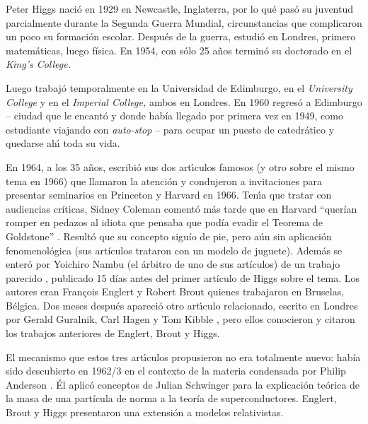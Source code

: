Peter Higgs naci\'o en 1929 en Newcastle, Inglaterra, por lo qu\'e
pas\'{o} su juventud parcialmente durante la Segunda Guerra Mundial,
circunstancias que complicaron un poco su formaci\'on escolar.
Despu\'es de la guerra, estudi\'o en Londres, primero matem\'aticas,
luego f\'isica. En 1954, con s\'olo 25 a\~nos termin\'o su
doctorado en el {\it King's College.}

Luego trabaj\'{o} temporalmente en la Universidad de Edimburgo,
en el {\it University College} y en el {\it Imperial College,} ambos
en Londres.
En 1960 regres\'{o} a Edimburgo -- ciudad que le encant\'o y donde
hab\'ia llegado por primera vez en 1949, como estudiante viajando
con {\it auto-stop} -- para ocupar un puesto de catedr\'{a}tico y
quedarse ah\'{\i} toda su vida.

	


En 1964, a los 35 a\~{n}os, escribi\'o sus dos art\'{\i}culos famosos
(y otro sobre el mismo tema en 1966) \cite{Higgs} que llamaron la
atenci\'{o}n y condujeron a invitaciones para presentar seminarios en
Princeton y Harvard en 1966. Ten\'{\i}a que tratar con audiencias cr\'iticas,
Sidney Coleman coment\'{o} m\'{a}s tarde que en Harvard ``quer\'ian
romper en pedazos al idiota que pensaba que pod\'ia evadir el
Teorema de Goldstone'' \cite{boson}. Result\'{o} que su concepto sigu\'io
de pie, pero a\'un sin aplicaci\'{o}n fenomenol\'{o}gica
(sus art\'iculos trataron con un modelo de juguete). Adem\'{a}s
se enter\'{o} por Yoichiro Nambu (el \'arbitro de uno de sus
art\'iculos) de un trabajo parecido \cite{EB}, publicado
15 d\'ias antes del primer art\'iculo de Higgs sobre el tema.
Los autores eran Fran\c{c}ois Englert y Robert Brout quienes
trabajaron en Bruselas, B\'elgica. Dos meses despu\'{e}s apareci\'{o}
otro art\'{\i}culo relacionado, escrito en Londres por
Gerald Guralnik, Carl Hagen y Tom Kibble \cite{GHK}, pero ellos
conocieron y citaron los trabajos anteriores de Englert, Brout y Higgs.



El mecanismo que estos tres art\'{\i}culos propusieron no era
totalmente nuevo: hab\'ia sido descubierto en 1962/3 en el contexto de la
materia condensada por Philip Anderson \cite{Anderson}. \'El aplic\'o
conceptos de Julian Schwinger \cite{Schwinger} para la explicaci\'on
te\'orica de la masa de una part\'icula de norma a la teor\'ia de
superconductores. Englert, Brout y Higgs presentaron una
extensi\'on a modelos relativistas.



